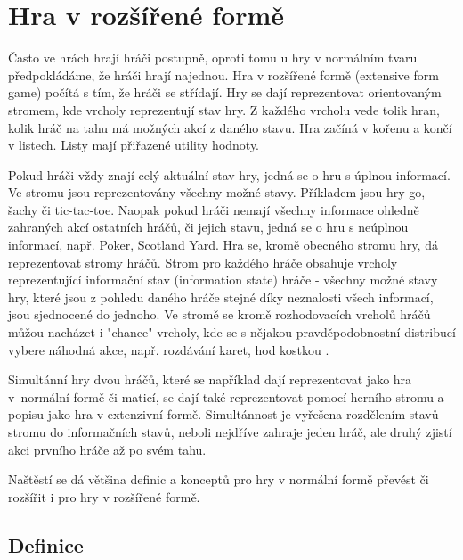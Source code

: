 \section{Hra v rozšířené formě}
Často ve hrách hrají hráči postupně, oproti tomu u hry v normálním tvaru předpokládáme, že hráči hrají najednou. Hra v rozšířené formě (extensive form game) počítá s tím, že hráči se střídají. Hry se dají reprezentovat orientovaným stromem, kde vrcholy reprezentují stav hry. Z každého vrcholu vede tolik hran, kolik hráč na tahu má možných akcí z daného stavu. Hra začíná v kořenu a končí v listech. Listy mají přiřazené utility hodnoty.

Pokud hráči vždy znají celý aktuální stav hry, jedná se o hru s úplnou informací. Ve stromu jsou reprezentovány všechny možné stavy. Příkladem jsou hry go, šachy či tic-tac-toe. Naopak pokud hráči nemají všechny informace ohledně zahraných akcí ostatních hráčů, či jejich stavu, jedná se o hru s neúplnou informací, např. Poker, Scotland Yard. Hra se, kromě obecného stromu hry, dá reprezentovat stromy hráčů. Strom pro každého hráče obsahuje vrcholy reprezentující informační stav (information state) hráče - všechny možné stavy hry, které jsou z pohledu daného hráče stejné díky neznalosti všech informací, jsou sjednocené do jednoho. Ve stromě se kromě rozhodovacích vrcholů hráčů můžou nacházet i "chance" vrcholy, kde se s nějakou pravděpodobnostní distribucí vybere náhodná akce, např. rozdávání karet, hod kostkou \cite{Schmid}.  

Simultánní hry dvou hráčů, které se například dají reprezentovat jako hra v~normální formě či maticí, se dají také reprezentovat pomocí herního stromu a popisu jako hra v extenzivní formě. Simultánnost je vyřešena rozdělením stavů stromu do informačních stavů, neboli nejdříve zahraje jeden hráč, ale druhý zjistí akci prvního hráče až po svém tahu.  

Naštěstí se dá většina definic a konceptů pro hry v normální formě převést či rozšířit i pro hry v rozšířené formě.

\subsection{Definice}

